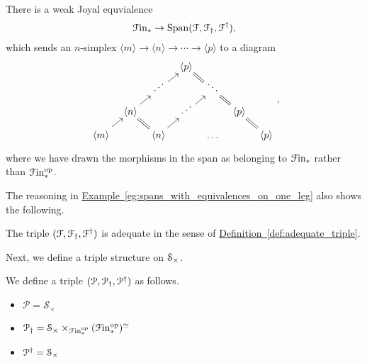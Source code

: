 \documentclass[main.tex]{subfiles}
\begin{document}
\begin{lemma}
  There is a weak Joyal equvialence
  \begin{equation*}
    \Finp \to \Span\triple{F},
  \end{equation*}
  which sends an $n$-simplex $\langle m \rangle \to \langle n \rangle \to \cdots \to \langle p \rangle$ to a diagram
  \begin{equation*}
    \begin{tikzcd}[row sep=small, column sep=tiny]
      &&& \respace{\langle p \rangle}
      \\
      && \respace{\iddots}
      \arrow[ur]
      && \respace{\ddots}
      \arrow[ul, equals]
      \\
      & \respace{\langle n \rangle}
      \arrow[ur]
      && \respace{\iddots}
      \arrow[ur]
      && \respace{\langle p \rangle}
      \arrow[ul, equals]
      \\
      \langle m \rangle
      \arrow[ur]
      && \respace{\langle n \rangle}
      \arrow[ul, equals]
      \arrow[ur]
      && \respace{\dots}
      && \respace{\langle p \rangle}
      \arrow[ul, equals]
    \end{tikzcd},
  \end{equation*}
  where we have drawn the morphisms in the span as belonging to $\Finp$ rather than $\Finp\op$.
\end{lemma}

The reasoning in \hyperref[eg:spans_with_equivalences_on_one_leg]{Example~\ref*{eg:spans_with_equivalences_on_one_leg}} also shows the following.

\begin{proposition}
  The triple $\triple{F}$ is adequate in the sense of \hyperref[def:adequate_triple]{Definition~\ref*{def:adequate_triple}}.
\end{proposition}

Next, we define a triple structure on $\S_{\times}$.

\begin{definition}
  We define a triple $\triple{P}$ as follows.
  \begin{itemize}
    \item $\mathcal{P} = \mathcal{S}_{\times}$

    \item $\mathcal{P}\downdag = \mathcal{S}_{\times} \times_{\Finp\op} (\Finp\op)^{\simeq}$

    \item $\mathcal{P}\updag = \mathcal{S}_{\times}$
  \end{itemize}
\end{definition}
\end{document}
